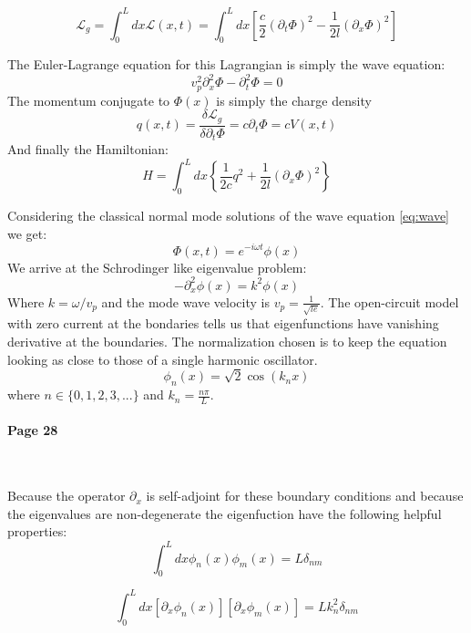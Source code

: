 \documentclass[12pt]{article}
\numberwithin{equation}{subsection}
\newcommand\page[1]{
{
\color{blue}\paragraph{
Page #1
}\mbox{}\\
}
}
\begin{document}
\begin{equation}
    \mathcal L_g = \int^L_0 dx \mathcal L(x,t) = \int ^L_0 dx \left [ \frac{c}{2}(\partial_t\Phi)^2 - \frac{1}{2l } (\partial _x\Phi)^2  \right]
    \label{eq:lag}
\end{equation}

The Euler-Lagrange equation for this Lagrangian is simply the wave equation:
\begin{equation}
v^2_p\partial^2_x\Phi - \partial ^2_t\Phi = 0
\label{eq:wave}
\end{equation}
The momentum conjugate to $\Phi(x)$ is simply the charge density
\begin{equation}
    q(x,t) = \frac{\delta \mathcal L_g}{\delta \partial_t \Phi} = c\partial_t \Phi = c V (x,t)
\end{equation}
And finally the Hamiltonian:
\begin{equation}
H = \int^L_0 dx \left \{ \frac{1}{2c} q^2 + \frac{1}{2l}(\partial_x\Phi )^2 \right \}
\end{equation}


Considering the classical normal mode solutions of the wave equation \ref{eq:wave} we get:
\begin{equation}
    \Phi (x,t) = e^{-i\omega t} \phi(x)
\end{equation}
We arrive at the Schrodinger like eigenvalue problem:
\begin{equation}
    -\partial^2_x\phi(x) = k^2\phi(x)
\end{equation}
Where $k=\omega/v_p$ and the mode wave velocity is $v_p = \frac{1}{\sqrt{le}}$.
The open-circuit model with zero current at the bondaries tells us that eigenfunctions have vanishing derivative at the boundaries. The normalization chosen is to keep the equation looking as close to those of a single harmonic oscillator.
\begin{equation}
    \phi_n(x) = \sqrt 2 \cos(k_n x )
\end{equation}
where $n \in \{0,1,2,3, ...\}$ and $k_n = \frac{n\pi}{L}$. 
\page{28}
Because the operator $\partial_x$ is self-adjoint for these boundary conditions and because the eigenvalues are non-degenerate the eigenfuction have the following helpful properties:
\begin{equation}
\int^L_0 dx \phi_n(x)\phi_m(x) = L \delta_{nm}    
\end{equation}

\begin{equation}
\int^L_0 dx [\partial_x\phi_n(x)][\partial_x\phi_m(x)] = Lk^2_n \delta_{nm}    
\end{equation}
\end{document}
